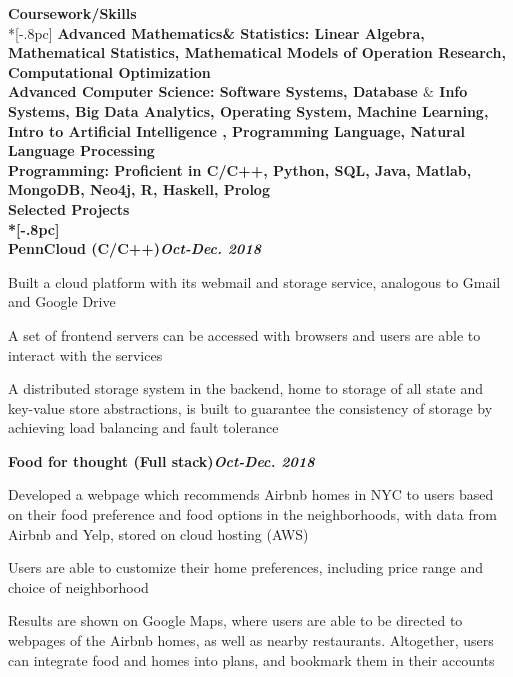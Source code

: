 {\large \bf Coursework/Skills} \\*[-.8pc]
\underline{\hspace{6.3in}} 
\bf Advanced Mathematics\& Statistics: \rm  Linear Algebra, Mathematical Statistics, Mathematical Models of Operation Research, Computational Optimization\\
\bf Advanced Computer Science: \rm  Software Systems, Database $\&$ Info Systems, Big Data Analytics, Operating System, Machine Learning, Intro to Artificial Intelligence , Programming Language, Natural Language Processing\\
\bf Programming: \rm Proficient in C/C++, Python, SQL, Java, Matlab,  MongoDB, Neo4j, R, Haskell, Prolog\\

{\large \bf Selected Projects} \\*[-.8pc]
\underline{\hspace{6.3in}} \\
\bf PennCloud (C/C++)\hfill{\it Oct-Dec. 2018}\rm\\
\vspace{-4mm}
\begin{list2}
\item Built a cloud platform with its webmail and storage service, analogous to Gmail and Google Drive
\item A set of frontend servers can be accessed with browsers and users are able to interact with the services
\item  A distributed storage system in the backend, home to storage of all state and key-value store abstractions, is built to guarantee the consistency of storage by achieving load balancing and fault tolerance
\end{list2}

\bf  Food for thought (Full stack)\hfill{\it Oct-Dec. 2018}\rm\\
\vspace{-4mm}
\begin{list2}
\item Developed a webpage which recommends Airbnb homes in NYC to users based on their food 
preference and food options in the neighborhoods, with data from Airbnb and Yelp, stored on cloud hosting (AWS) 
\item Users are able to customize their home preferences, including price range and choice of neighborhood 
\item Results are shown on Google Maps, where users are able to be directed to webpages of  the Airbnb homes, as well as nearby restaurants. Altogether, users can integrate food and homes into plans,  and bookmark them in their accounts
\end{list2}


